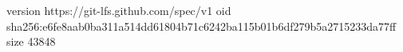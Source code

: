 version https://git-lfs.github.com/spec/v1
oid sha256:e6fe8aab0ba311a514dd61804b71c6242ba115b01b6df279b5a2715233da77ff
size 43848
